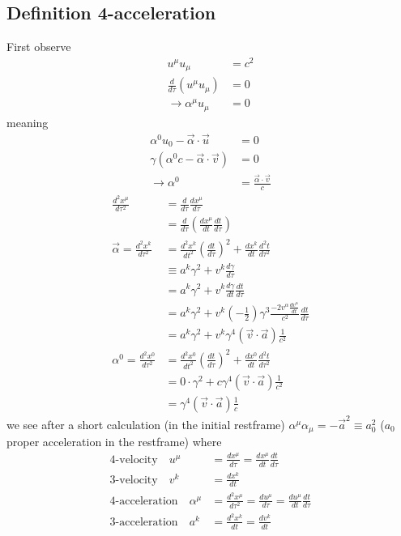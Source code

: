 \documentclass[../main.tex]{subfiles}
\begin{document}
\subsection{Definition 4-acceleration}
First observe
\begin{align}
u^\mu u_\mu&=c^2\\
\frac{d}{d\tau}(u^\mu u_\mu)&=0\\
\rightarrow \alpha^\mu u_\mu&=0
\end{align}
meaning
\begin{align}
\alpha^0 u_0-\vec{\alpha}\cdot\vec{u}&=0\\
\gamma(\alpha^0 c-\vec{\alpha}\cdot\vec{v})&=0\\
\rightarrow \alpha^0&=\frac{\vec{\alpha}\cdot\vec{v}}{c}
\end{align}
\begin{align}
\frac{d^2x^\mu}{d\tau^2}
&=\frac{d}{d\tau}\frac{dx^\mu}{d\tau}\\
&=\frac{d}{d\tau}\left(\frac{dx^\mu}{dt}\frac{dt}{d\tau}\right)\\
\vec{\alpha}=
\frac{d^2x^k}{d\tau^2}&=\frac{d^2x^k}{dt^2}\left(\frac{dt}{d\tau}\right)^2+\frac{dx^k}{dt}\frac{d^2t}{d\tau^2}\\
&\equiv a^k\gamma^2+v^k\frac{d\gamma}{d\tau}\\
&=a^k\gamma^2+v^k\frac{d\gamma}{dt}\frac{dt}{d\tau}\\
&=a^k\gamma^2+v^k\left(-\frac{1}{2}\right)\gamma^3\frac{-2v^\alpha\frac{dv^\alpha}{dt}}{c^2} \frac{dt}{d\tau}\\
&=a^k\gamma^2+v^k\gamma^4(\vec{v}\cdot\vec{a})\frac{1}{c^2}\\
\alpha^0=
\frac{d^2x^0}{d\tau^2}
&=\frac{d^2x^0}{dt^2}\left(\frac{dt}{d\tau}\right)^2+\frac{dx^0}{dt}\frac{d^2t}{d\tau^2}\\
&=0\cdot\gamma^2+c\gamma^4(\vec{v}\cdot\vec{a})\frac{1}{c^2}\\
&=\gamma^4(\vec{v}\cdot\vec{a})\frac{1}{c}
\end{align}
we see after a short calculation (in the initial restframe) $\alpha^\mu\alpha_\mu=-\vec{a}^2\equiv a^2_0$ ($a_0$ proper acceleration in the restframe)  where
\begin{align}
\text{4-velocity}\quad u^\mu&=\frac{dx^\mu}{d\tau}=\frac{dx^\mu}{dt}\frac{dt}{d\tau}\\
\text{3-velocity}\quad v^k&=\frac{dx^k}{dt}\\
\text{4-acceleration}\quad \alpha^\mu&=\frac{d^2x^\mu}{d\tau^2}=\frac{du^\mu}{d\tau}=\frac{du^\mu}{dt}\frac{dt}{d\tau}\\
\text{3-acceleration}\quad a^k&=\frac{d^2x^k}{dt}=\frac{dv^k}{dt}
\end{align}
\end{document}
